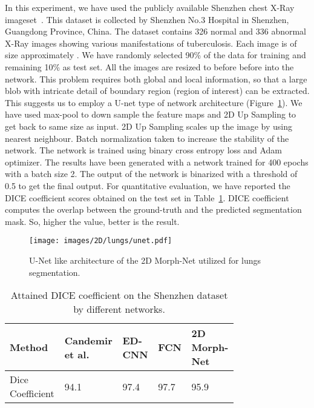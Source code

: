 \documentclass[12pt]{article}
\begin{document}
 In this experiment, we have used the publicly available Shenzhen chest X-Ray imageset~\cite{jaeger2014two}. This dataset is collected by Shenzhen No.3 Hospital in Shenzhen, Guangdong Province, China. The dataset contains 326 normal and 336 abnormal X-Ray images showing various manifestations of tuberculosis. Each image is of size approximately . We have randomly selected 90\% of the data for training and remaining 10\% as test set. All the images are resized to  before before into the network. 
This problem requires both global and local information, so that a large blob with intricate detail of boundary region (region of interest) can be extracted. This suggests us to employ a U-net\cite{ronneberger2015u} type of network architecture (Figure~\ref{fig:unet}). 
We have used max-pool to down sample the feature maps and 2D Up Sampling to get back to same size as input. 2D Up Sampling scales up the image by using nearest neighbour. Batch normalization taken to increase the stability of the network.
The network is trained using binary cross entropy loss and Adam optimizer. The results have been generated with a network trained for 400 epochs with a batch size 2. The output of the network is binarized with a threshold of 0.5 to get the final output. For quantitative evaluation, we have reported the DICE coefficient scores obtained on the test set in Table~\ref{Shenzhen_quant}. DICE coefficient computes the overlap between the ground-truth and the predicted segmentation mask. So, higher the value, better is the result.

\begin{figure}
    \centering
    \texttt{[image: images/2D/lungs/unet.pdf]}
    \caption{U-Net like architecture of the 2D Morph-Net utilized for lungs segmentation.}
    \label{fig:unet}
\end{figure}
\begin{table}
    \centering
    \caption{Attained DICE coefficient on the Shenzhen dataset by different networks.}
    \label{Shenzhen_quant}
    \begin{tabular}{m{0.2\linewidth}m{0.15\linewidth}m{0.15\linewidth}m{0.1\linewidth}m{0.15\linewidth}}
    \toprule
    Method & Candemir et al.\cite{candemir2013lung} & ED-CNN\cite{kalinovsky2016lung} & FCN\cite{rashid2018fully}  & 2D Morph-Net\\
    \midrule
    Dice Coefficient &94.1 &97.4&97.7 & 95.9 \\
    \bottomrule
    \end{tabular}
\end{table} 
\end{document}
